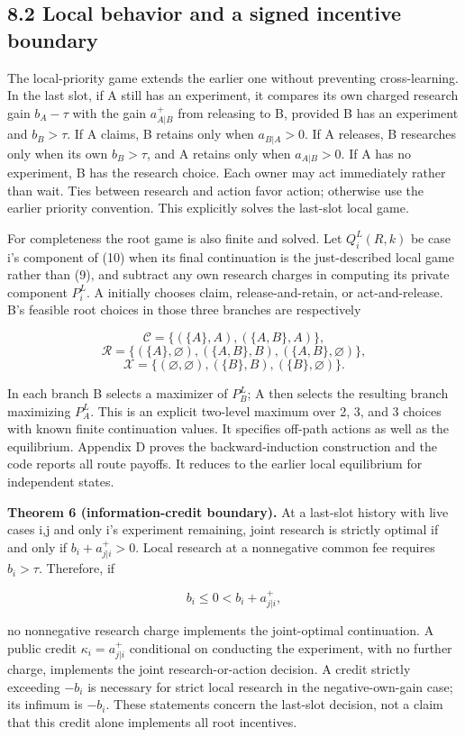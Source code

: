 \documentclass[
  11pt,
]{article}
\begin{document}
\subsection{8.2 Local behavior and a signed incentive
boundary}\label{local-behavior-and-a-signed-incentive-boundary}

The local-priority game extends the earlier one without preventing
cross-learning. In the last slot, if A still has an experiment, it
compares its own charged research gain \(b_A-\tau\) with the gain
\(a_{A|B}^+\) from releasing to B, provided B has an experiment and
\(b_B>\tau\). If A claims, B retains only when \(a_{B|A}>0\). If A
releases, B researches only when its own \(b_B>\tau\), and A retains
only when \(a_{A|B}>0\). If A has no experiment, B has the research
choice. Each owner may act immediately rather than wait. Ties between
research and action favor action; otherwise use the earlier priority
convention. This explicitly solves the last-slot local game.

For completeness the root game is also finite and solved. Let
\(Q_i^L(R,k)\) be case i's component of (10) when its final continuation
is the just-described local game rather than (9), and subtract any own
research charges in computing its private component \(P_i^L\). A
initially chooses claim, release-and-retain, or act-and-release. B's
feasible root choices in those three branches are respectively

\[\mathcal C=\{(\{A\},A),(\{A,B\},A)\},\]
\[\mathcal R=\{(\{A\},\varnothing),(\{A,B\},B),(\{A,B\},\varnothing)\},\]
\[\mathcal X=\{(\varnothing,\varnothing),(\{B\},B),(\{B\},\varnothing)\}.\]

In each branch B selects a maximizer of \(P_B^L\); A then selects the
resulting branch maximizing \(P_A^L\). This is an explicit two-level
maximum over 2, 3, and 3 choices with known finite continuation values.
It specifies off-path actions as well as the equilibrium. Appendix D
proves the backward-induction construction and the code reports all
route payoffs. It reduces to the earlier local equilibrium for
independent states.

\textbf{Theorem 6 (information-credit boundary).} At a last-slot history
with live cases i,j and only i's experiment remaining, joint research is
strictly optimal if and only if \(b_i+a_{j|i}^+>0\). Local research at a
nonnegative common fee requires \(b_i>\tau\). Therefore, if

\[b_i\leq0<b_i+a_{j|i}^+, \tag{12}\]

no nonnegative research charge implements the joint-optimal
continuation. A public credit \(\kappa_i=a_{j|i}^+\) conditional on
conducting the experiment, with no further charge, implements the joint
research-or-action decision. A credit strictly exceeding \(-b_i\) is
necessary for strict local research in the negative-own-gain case; its
infimum is \(-b_i\). These statements concern the last-slot decision,
not a claim that this credit alone implements all root incentives.
\end{document}
